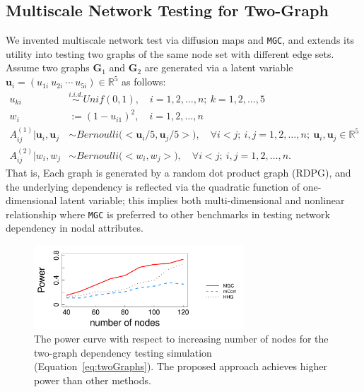 \documentclass[simplex.tex]{subfiles}
\begin{document}
\subsection{Multiscale Network Testing for Two-Graph} 

We invented multiscale network test via diffusion maps and \texttt{MGC}, and extends its utility into testing two graphs of the same node set with different edge sets. Assume two graphs $\mathbf{G}_{1}$ and $\mathbf{G}_{2}$ are generated via a latent variable $\mathbf{u}_{i} = ( u_{1i}~ u_{2i}~ \cdots ~u_{5i} ) \in \mathbb{R}^{5}$ as follows:
\begin{equation}
\begin{split}
u_{ki} & \overset{i.i.d.}{\sim} Unif(0, 1), \quad i = 1,2, \ldots, n;~k = 1,2,\ldots, 5 \\
w_{i} & := (1- u_{i1} )^{2}, \quad i = 1,2, \ldots, n \\
A^{(1)}_{ij} \big| \mathbf{u}_{i}, \mathbf{u}_{j} & \sim Bernoulli \big( <\mathbf{u}_{i}/5, \mathbf{u}_{j}/5  > \big), \quad \forall i < j;~i,j=1,2,\ldots,n;~\mathbf{u}_{i}, \mathbf{u}_{j} \in \mathbb{R}^{5} \\
A^{(2)}_{ij} \big| w_{i}, w_{j} & \sim Bernoulli \big( <w_{i}, w_{j}  > \big), \quad \forall i < j;~i,j=1,2,\ldots,n.
\end{split}
\label{eq:twoGraphs}
\end{equation}
That is, Each graph is generated by a random dot product graph (RDPG), and the underlying dependency is reflected via the quadratic function of one-dimensional latent variable; this implies both multi-dimensional and nonlinear relationship where \texttt{MGC} is preferred to other benchmarks in testing network dependency in nodal attributes.  

\begin{figure}[h!]
\begin{cframed}
\centering
	\includegraphics[width=0.7\textwidth]{../../figs/Graphs}
	\caption{The power curve with respect to increasing number of nodes for the two-graph dependency testing simulation (Equation~\ref{eq:twoGraphs}). The proposed approach achieves higher power than other methods.}
    \label{fig:graphtest}
		\end{cframed}
\end{figure}
\end{document}
